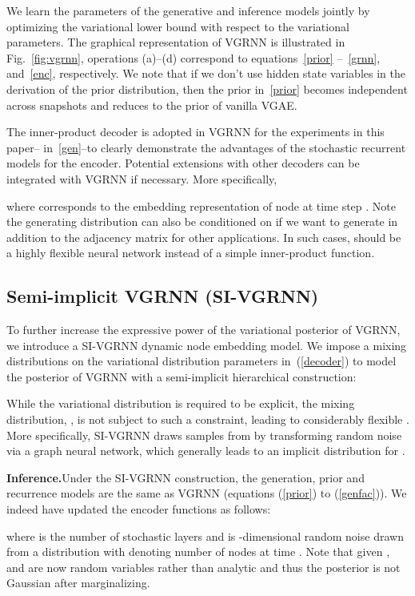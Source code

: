 \documentclass{article}
\begin{document}
We learn the parameters of the generative and inference models jointly by optimizing the variational lower bound with respect to the variational parameters. The graphical representation of VGRNN is illustrated in Fig.~\ref{fig:vgrnn}, operations (a)--(d) correspond to equations~\eqref{prior} --~\eqref{grnn}, and~\eqref{enc}, respectively. We note that if
we don't use hidden state variables  in the derivation of the prior distribution, then the prior in~\eqref{prior} becomes independent across snapshots and reduces to the prior of vanilla VGAE.

The inner-product decoder is adopted in VGRNN for the experiments in this paper--  in~\eqref{gen}--to clearly demonstrate the advantages of the stochastic recurrent models for the encoder. Potential extensions with other decoders can be integrated with VGRNN if necessary. More specifically,

where  corresponds to the embedding representation of node  at time step . Note the generating distribution can also be conditioned on  if we want to generate  in addition to the adjacency matrix for other applications. In such cases,  should be a highly flexible neural network instead of a simple inner-product function.


\subsection{Semi-implicit VGRNN (SI-VGRNN)}
To further increase the expressive power of the variational posterior of VGRNN, we introduce a SI-VGRNN dynamic node embedding model.
We impose a mixing distributions on the variational distribution parameters in~(\ref{decoder}) to model the posterior of VGRNN with a semi-implicit hierarchical construction:

While the variational distribution  is required to be explicit, the mixing distribution, , is not subject to such a constraint, leading
to considerably flexible . More specifically, SI-VGRNN draws samples from  by transforming random noise  via a graph neural network, which generally leads to an implicit distribution for .


\noindent \textbf{Inference.}\quad Under the SI-VGRNN construction, the generation, prior and recurrence models are the same as VGRNN (equations (\ref{prior}) to (\ref{genfac})). We indeed have updated the encoder functions as follows:

where  is the number of stochastic layers and  is -dimensional random noise drawn from a distribution  with  denoting number of nodes at time . Note that given ,  and  are
now random variables rather than 
analytic and thus 
the posterior
is not Gaussian after marginalizing. 
\end{document}

